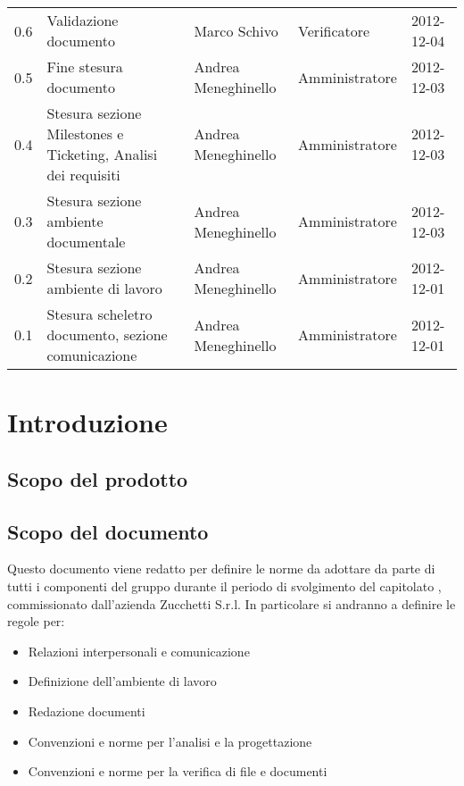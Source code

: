 \begin{tabularx}{\textwidth}{lXlll}
0.6 & Validazione documento & Marco Schivo & Verificatore & 2012-12-04\\
0.5 & Fine stesura documento & Andrea Meneghinello & Amministratore & 2012-12-03\\
0.4 & Stesura sezione Milestones e Ticketing, Analisi dei requisiti & Andrea Meneghinello & Amministratore & 2012-12-03\\
0.3 & Stesura sezione ambiente documentale & Andrea Meneghinello & Amministratore & 2012-12-03\\
0.2 & Stesura sezione ambiente di lavoro & Andrea Meneghinello & Amministratore & 2012-12-01\\
0.1 & Stesura scheletro documento, sezione comunicazione & Andrea Meneghinello & Amministratore & 2012-12-01\\
\bottomrule
\end{tabularx}
\clearpage



\setcounter{page}{1}
\pagestyle{normal}

\clearpage
\section{Introduzione}
\subsection{Scopo del prodotto}
\purpose

\subsection{Scopo del documento}
Questo documento viene redatto per definire le norme da adottare da parte di tutti i componenti del gruppo \team{} durante il periodo di svolgimento del capitolato \caName, commissionato dall'azienda Zucchetti S.r.l. In particolare si andranno a definire le regole per:
\begin{itemize}
\item Relazioni interpersonali e comunicazione
\item Definizione dell'ambiente di lavoro
\item Redazione documenti
\item Convenzioni e norme per l'analisi e la progettazione
\item Convenzioni e norme per la verifica di file e documenti
\end{itemize}

